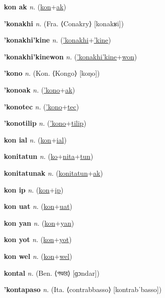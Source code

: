 \textbf{\hypertarget{kon ak}{kon ak}} \textit{n.} (\hyperlink{kon}{kon}+\allowbreak \hyperlink{ak}{ak})


\textbf{\hypertarget{'konakhi}{'konakhi}} \textit{n.} (Fra. ⟨Conakry⟩ [konakʁi])


\textbf{\hypertarget{'konakhi'kine}{'konakhi'kine}} \textit{n.} (\hyperlink{'konakhi}{'konakhi}+\allowbreak \hyperlink{'kine}{'kine})


\textbf{\hypertarget{'konakhi'kinewon}{'konakhi'kinewon}} \textit{n.} (\hyperlink{'konakhi'kine}{'konakhi'kine}+\allowbreak \hyperlink{won}{won})


\textbf{\hypertarget{'kono}{'kono}} \textit{n.} (Kon. ⟨Kongo⟩ [koŋo])


\textbf{\hypertarget{'konoak}{'konoak}} \textit{n.} (\hyperlink{'kono}{'kono}+\allowbreak \hyperlink{ak}{ak})


\textbf{\hypertarget{'konotec}{'konotec}} \textit{n.} (\hyperlink{'kono}{'kono}+\allowbreak \hyperlink{tec}{tec})


\textbf{\hypertarget{'konotilip}{'konotilip}} \textit{n.} (\hyperlink{'kono}{'kono}+\allowbreak \hyperlink{tilip}{tilip})


\textbf{\hypertarget{kon ial}{kon ial}} \textit{n.} (\hyperlink{kon}{kon}+\allowbreak \hyperlink{ial}{ial})


\textbf{\hypertarget{konitatun}{konitatun}} \textit{n.} (\hyperlink{ko}{ko}+\allowbreak \hyperlink{nita}{nita}+\allowbreak \hyperlink{tun}{tun})


\textbf{\hypertarget{konitatunak}{konitatunak}} \textit{n.} (\hyperlink{konitatun}{konitatun}+\allowbreak \hyperlink{ak}{ak})


\textbf{\hypertarget{kon ip}{kon ip}} \textit{n.} (\hyperlink{kon}{kon}+\allowbreak \hyperlink{ip}{ip})


\textbf{\hypertarget{kon uat}{kon uat}} \textit{n.} (\hyperlink{kon}{kon}+\allowbreak \hyperlink{uat}{uat})


\textbf{\hypertarget{kon yan}{kon yan}} \textit{n.} (\hyperlink{kon}{kon}+\allowbreak \hyperlink{yan}{yan})


\textbf{\hypertarget{kon yot}{kon yot}} \textit{n.} (\hyperlink{kon}{kon}+\allowbreak \hyperlink{yot}{yot})


\textbf{\hypertarget{kon wel}{kon wel}} \textit{n.} (\hyperlink{kon}{kon}+\allowbreak \hyperlink{wel}{wel})


\textbf{\hypertarget{kontal}{kontal}} \textit{n.} (Ben. ⟨{\bengali{}গণ্ডার}⟩ [ɡɔndar])


\textbf{\hypertarget{'kontapaso}{'kontapaso}} \textit{n.} (Ita. ⟨contrabbasso⟩ [kontrabˈbasso])


